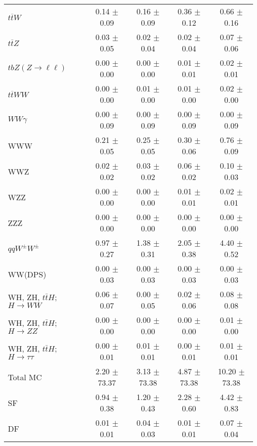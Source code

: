 \begin{tabular}{l|cccc}
                   $t\overline{t}W$ &  0.14 $\pm$  0.09 &  0.16 $\pm$  0.09 &  0.36 $\pm$  0.12 &  0.66 $\pm$  0.16 \\
                   $t\overline{t}Z$ &  0.03 $\pm$  0.05 &  0.02 $\pm$  0.04 &  0.02 $\pm$  0.04 &  0.07 $\pm$  0.06 \\
    $tbZ (Z \rightarrow \ell \ell)$ &  0.00 $\pm$  0.00 &  0.00 $\pm$  0.00 &  0.01 $\pm$  0.01 &  0.02 $\pm$  0.01 \\
                  $t\overline{t}WW$ &  0.00 $\pm$  0.00 &  0.01 $\pm$  0.00 &  0.01 $\pm$  0.00 &  0.02 $\pm$  0.00 \\
                         $WW\gamma$ &  0.00 $\pm$  0.09 &  0.00 $\pm$  0.09 &  0.00 $\pm$  0.09 &  0.00 $\pm$  0.09 \\
                                WWW &  0.21 $\pm$  0.05 &  0.25 $\pm$  0.05 &  0.30 $\pm$  0.06 &  0.76 $\pm$  0.09 \\
                                WWZ &  0.02 $\pm$  0.02 &  0.03 $\pm$  0.02 &  0.06 $\pm$  0.02 &  0.10 $\pm$  0.03 \\
                                WZZ &  0.00 $\pm$  0.00 &  0.00 $\pm$  0.00 &  0.01 $\pm$  0.01 &  0.02 $\pm$  0.01 \\
                                ZZZ &  0.00 $\pm$  0.00 &  0.00 $\pm$  0.00 &  0.00 $\pm$  0.00 &  0.00 $\pm$  0.00 \\
                 $qqW^{\pm}W^{\pm}$ &  0.97 $\pm$  0.27 &  1.38 $\pm$  0.31 &  2.05 $\pm$  0.38 &  4.40 $\pm$  0.52 \\
                            WW(DPS) &  0.00 $\pm$  0.03 &  0.00 $\pm$  0.03 &  0.00 $\pm$  0.03 &  0.00 $\pm$  0.03 \\
WH, ZH, $t\bar{t}H$; $H \rightarrow WW$ &  0.06 $\pm$  0.07 &  0.00 $\pm$  0.05 &  0.02 $\pm$  0.06 &  0.08 $\pm$  0.08 \\
WH, ZH, $t\bar{t}H$; $H \rightarrow ZZ$ &  0.00 $\pm$  0.00 &  0.00 $\pm$  0.00 &  0.00 $\pm$  0.00 &  0.01 $\pm$  0.00 \\
WH, ZH, $t\bar{t}H$; $H \rightarrow \tau\tau$ &  0.00 $\pm$  0.01 &  0.01 $\pm$  0.01 &  0.00 $\pm$  0.01 &  0.01 $\pm$  0.01 \\
\hline\hline
                           Total MC &  2.20 $\pm$ 73.37 &  3.13 $\pm$ 73.38 &  4.87 $\pm$ 73.38 & 10.20 $\pm$ 73.38 \\
\hline
                                 SF &  0.94 $\pm$  0.38 &  1.20 $\pm$  0.43 &  2.28 $\pm$  0.60 &  4.42 $\pm$  0.83 \\
                                 DF &  0.01 $\pm$  0.01 &  0.04 $\pm$  0.03 &  0.01 $\pm$  0.01 &  0.07 $\pm$  0.04 \\

\end{tabular}
